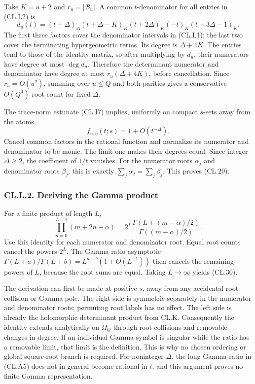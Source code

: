 Take \(K=u+2\) and \(r_u=|\mathcal B_u|\). A common \(t\)-denominator for all entries in (CL.L2) is \[
d_u(t)=
(t+\Delta)_\Delta
(t+\Delta-K)_K(t+2\Delta)_K
(-t)_K(t+3\Delta-1)_K.
\tag{CL.L3}
\] The first three factors cover the denominator intervals in (CL.L1); the last two cover the terminating hypergeometric terms. Its degree is \(\Delta+4K\). The entries tend to those of the identity matrix, so after multiplying by \(d_u\), their numerators have degree at most \(\deg d_u\). Therefore the determinant numerator and denominator have degree at most \(r_u(\Delta+4K)\), before cancellation. Since \(r_u=O(u^2)\), summing over \(u\leq Q\) and both parities gives a conservative \(O(Q^4)\) root count for fixed \(\Delta\).

The trace-norm estimate (CL.I7) implies, uniformly on compact \(s\)-sets away from the atoms, \[
f_{u,\eta}(t;s)=1+O(t^{-\Delta}).
\tag{CL.L4}
\] Cancel common factors in the rational function and normalize its numerator and denominator to be monic. The limit one makes their degrees equal. Since integer \(\Delta\geq2\), the coefficient of \(1/t\) vanishes. For the numerator roots \(\alpha_j\) and denominator roots \(\beta_j\), this is exactly \(\sum_j\alpha_j=\sum_j\beta_j\). This proves (CL.29).

\hypertarget{cl.l.2.-deriving-the-gamma-product}{%
\subsubsection{CL.L.2. Deriving the Gamma product}\label{cl.l.2.-deriving-the-gamma-product}}

For a finite product of length \(L\), \[
\prod_{n=0}^{L-1}(m+2n-\alpha)
=2^L\frac{\Gamma(L+(m-\alpha)/2)}
{\Gamma((m-\alpha)/2)}.
\] Use this identity for each numerator and denominator root. Equal root counts cancel the powers \(2^L\). The Gamma ratio asymptotic \(\Gamma(L+a)/\Gamma(L+b)=L^{a-b}(1+O(L^{-1}))\) then cancels the remaining powers of \(L\), because the root sums are equal. Taking \(L\to\infty\) yields (CL.30).

The derivation can first be made at positive \(s\), away from any accidental root collision or Gamma pole. The right side is symmetric separately in the numerator and denominator roots; permuting root labels has no effect. The left side is already the holomorphic determinant product from CL.K. Consequently the identity extends analytically on \(\Omega_Q\) through root collisions and removable changes in degree. If an individual Gamma symbol is singular while the ratio has a removable limit, that limit is the definition. This is why no chosen ordering or global square-root branch is required. For noninteger \(\Delta\), the long Gamma ratio in (CL.A5) does not in general become rational in \(t\), and this argument proves no finite Gamma representation.

